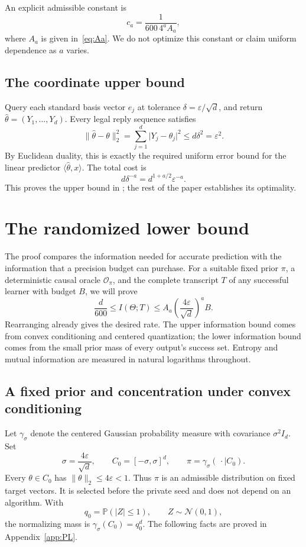 \documentclass[11pt,a4paper]{article}
\newcommand{\PP}{\mathbb P}
\newcommand{\eps}{\varepsilon}
\newcommand{\ip}[2]{\langle #1,#2\rangle}
\newcommand{\norm}[1]{\lVert #1\rVert}
\newcommand{\abs}[1]{\lvert #1\rvert}
\theoremstyle{definition}
\theoremstyle{remark}
\begin{document}
An explicit admissible constant is
\begin{equation}\label{eq:ca}
 c_a=\frac{1}{600\,4^a A_a},
\end{equation}
where $A_a$ is given in~\eqref{eq:Aa}. We do not optimize this constant or claim uniform dependence as $a$ varies.

\subsection{The coordinate upper bound}\label{sec:upper}
Query each standard basis vector $e_j$ at tolerance $\delta=\eps/\sqrt d$, and return $\widehat\theta=(Y_1,\ldots,Y_d)$. Every legal reply sequence satisfies
\[
 \norm{\widehat\theta-\theta}_2^2
 =\sum_{j=1}^d\abs{Y_j-\theta_j}^2
 \le d\delta^2=\eps^2.
\]
By Euclidean duality, this is exactly the required uniform error bound for the linear predictor $\ip{\widehat\theta}{x}$. The total cost is
\[
 d\delta^{-a}=d^{1+a/2}\eps^{-a}.
\]
This proves the upper bound in ; the rest of the paper establishes its optimality.

\section{The randomized lower bound}\label{sec:lower}
The proof compares the information needed for accurate prediction with the information that a precision budget can purchase. For a suitable fixed prior $\pi$, a deterministic causal oracle $\mathcal O_\pi$, and the complete transcript $T$ of any successful learner with budget $B$, we will prove
\begin{equation}\label{eq:proof-roadmap}
 \frac d{600}\le I(\Theta;T)
 \le A_a\left(\frac{4\eps}{\sqrt d}\right)^a B.
\end{equation}
Rearranging already gives the desired rate. The upper information bound comes from convex conditioning and centered quantization; the lower information bound comes from the small prior mass of every output's success set. Entropy and mutual information are measured in natural logarithms throughout.

\subsection{A fixed prior and concentration under convex conditioning}\label{sec:prior}
Let $\gamma_\sigma$ denote the centered Gaussian probability measure with covariance $\sigma^2 I_d$. Set
\begin{equation}\label{eq:prior}
 \sigma=\frac{4\eps}{\sqrt d},\qquad
 C_0=[-\sigma,\sigma]^d,\qquad
 \pi=\gamma_\sigma(\,\cdot\mid C_0).
\end{equation}
Every $\theta\in C_0$ has $\norm{\theta}_2\le4\eps<1$. Thus $\pi$ is an admissible distribution on fixed target vectors. It is selected before the private seed and does not depend on an algorithm. With
\begin{equation}\label{eq:q0}
 q_0=\PP(|Z|\le1),\qquad Z\sim\mathcal N(0,1),
\end{equation}
the normalizing mass is $\gamma_\sigma(C_0)=q_0^d$. The following facts are proved in Appendix~\ref{app:PL}.
\end{document}

